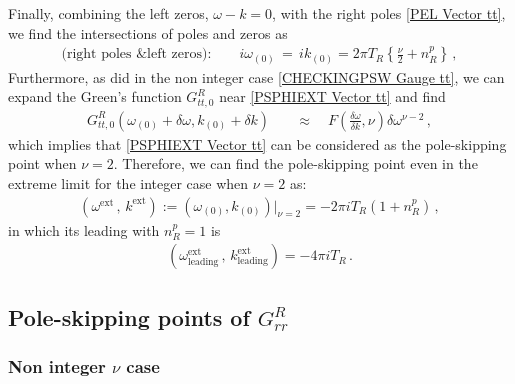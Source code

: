 \documentclass[11pt,a4paper]{article}
\begin{document}
Finally, combining the left zeros, $\omega-k=0$, with the right poles \eqref{PEL Vector tt}, we find the intersections of poles and zeros as
\begin{align}\label{PSPHIEXT Vector tt}
\text{(right poles \& left zeros):} \qquad
i \omega_{(0)} \, = \, i k_{(0)} = 2 \pi T_R \left\{ \frac{\nu}{2} + n^p_R \right\}\,,
\end{align}
Furthermore, as did in the non integer case \eqref{CHECKINGPSW Gauge tt}, we can expand the Green's function $G^R_{tt,0}$ near \eqref{PSPHIEXT Vector tt} and find
\begin{align}
G^R_{tt,0}(\omega_{(0)} + \delta \omega, k_{(0)} + \delta k)  &\quad\approx\quad F
\left(\frac{\delta \omega}{\delta k}, \nu\right)
\delta \omega^{\nu-2}  \,,
\end{align}
which implies that \eqref{PSPHIEXT Vector tt} can be considered as the pole-skipping point when $\nu=2$. Therefore, we can find the pole-skipping point even in the extreme limit for the integer case when $\nu=2$ as:
\begin{align}\label{answer111 Vector}
\left(\omega^{\text{ext}}\,,\, k^{\text{ext}}\right):= \left( \omega_{(0)}, k_{(0)} \right) \Big|_{\nu=2} = -2 \pi i T_R \left(1+n^p_R\right) \,,
\end{align}
in which its leading with $n^p_R=1$ is 
\begin{align}\label{eq:Zero T p-s Gauge}
\left( \omega^{\text{ext}}_\text{leading}\,,\, k^{\text{ext}}_\text{leading} \right) = -4 \pi i T_R \,.
\end{align}

\subsection{Pole-skipping points of $G^R_{rr}$}
\subsubsection{Non integer $\nu$ case}
\end{document}
